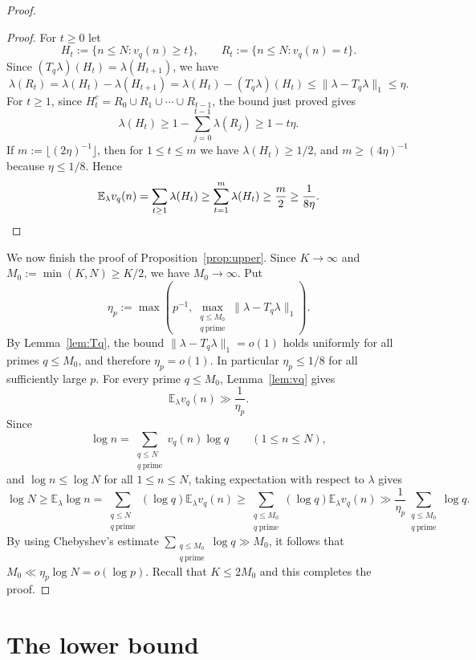\documentclass[11pt,letterpaper,reqno]{amsart}
\theoremstyle{definition}
\newcommand{\E}{\mathbb E}
\newcommand{\1}{\mathbf 1}
\begin{document}
\begin{proof}
\begin{proof}
For $t\ge0$ let
\[
    H_t:=\{n\le N:v_q(n)\ge t\},
    \qquad
    R_t:=\{n\le N:v_q(n)=t\}.
\]
Since $(T_q\lambda)(H_t)=\lambda(H_{t+1})$, we have
\[
    \lambda(R_t)=\lambda(H_t)-\lambda(H_{t+1})
            =\lambda(H_t)-(T_q\lambda)(H_t)
            \le \|\lambda-T_q\lambda\|_1\le\eta.
\]
For \(t\ge1\), since $H_t^c=R_0\cup R_1\cup\cdots\cup R_{t-1}$, the bound just proved gives
\[
        \lambda(H_t)\ge 1-\sum_{j=0}^{t-1}\lambda(R_j)\ge 1-t\eta .
\]
If \(m:=\lfloor(2\eta)^{-1}\rfloor\), then for \(1\le t\le m\) we have
\(\lambda(H_t)\ge1/2\), and \(m\ge(4\eta)^{-1}\) because \(\eta\le1/8\).  Hence
\[
    \E_\lambda v_q(n)=\sum_{t\ge1}\lambda(H_t)
    \ge \sum_{t=1}^m \lambda(H_t)
    \ge \frac{m}{2}\ge \frac{1}{8\eta}.
\qedhere\]
\end{proof}

We now finish the proof of Proposition~\ref{prop:upper}.  Since $K\to\infty$ and
$M_0:=\min(K,N)\ge K/2$, we have $M_0\to\infty$.  Put
\[
    \eta_p:=\max\left(p^{-1},\max_{\substack{q\le M_0\\ q\ \mathrm{prime}}}
    \|\lambda-T_q\lambda\|_1\right).
\]
By Lemma~\ref{lem:Tq}, the bound \(\|\lambda-T_q\lambda\|_1=o(1)\) holds uniformly for all primes \(q\le M_0\), and therefore $\eta_p=o(1)$. In particular \(\eta_p\le 1/8\) for all sufficiently large \(p\).  For every prime $q\le M_0$, Lemma~\ref{lem:vq} gives
\[
        \E_\lambda v_q(n)\gg \frac1{\eta_p}.
\]
Since
\[
        \log n=\sum_{\substack{q\le N\\ q\ \mathrm{prime}}}v_q(n)\log q
        \qquad (1\le n\le N),
\]
and \(\log n\le \log N\) for all \(1\le n\le N\), taking expectation with
respect to \(\lambda\) gives
\[
    \log N
    \ge \E_\lambda\log n
    = \sum_{\substack{q\le N\\ q\ \mathrm{prime}}}
      (\log q)\E_\lambda v_q(n)
    \ge \sum_{\substack{q\le M_0\\ q\ \mathrm{prime}}}
      (\log q)\E_\lambda v_q(n)
    \gg \frac{1}{\eta_p}\sum_{\substack{q\le M_0\\ q\ \mathrm{prime}}}\log q.
\]
By using Chebyshev's estimate  $\sum_{\substack{q\le M_0\\ q\ \mathrm{prime}}}\log q\gg M_0$, 
it follows that
$M_0 \ll \eta_p \log N =o(\log p)$. Recall that $ K\le 2M_0$ and this completes the proof. 
\end{proof}

\section{The lower bound}\label{sec:lower}
\end{document}
